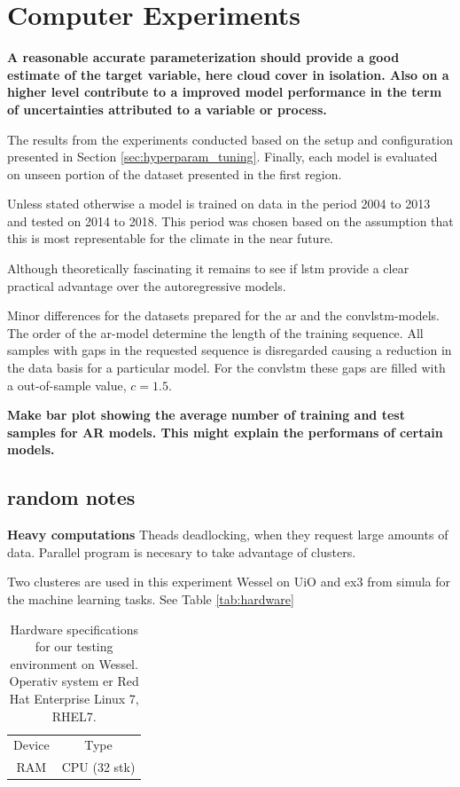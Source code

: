 \chapter{Computer Experiments} \label{ch:computer_experiments}

\textbf{A reasonable accurate parameterization should provide a good estimate of the target variable, here cloud cover in isolation. 
Also on a higher level contribute to a improved model performance in the term of uncertainties attributed to a variable or process.}

The results from the experiments conducted based on the setup and configuration presented in Section \ref{sec:hyperparam_tuning}. Finally, each model is evaluated on unseen portion of the dataset presented in the first region.

Unless stated otherwise a model is trained on data in the period 2004 to 2013 and tested on 2014 to 2018. This period was chosen based on the assumption that this is most representable for the climate in the near future.

Although theoretically fascinating it remains to see if \acrshort{lstm} provide a clear practical advantage over the autoregressive models.

Minor differences for the datasets prepared for the \acrshort{ar} and the \acrshort{convlstm}-models. The order of the \acrshort{ar}-model determine the length of the training sequence. All samples with gaps in the requested sequence is disregarded causing a reduction in the data basis for a particular model. For the \acrshort{convlstm} these gaps are filled with a out-of-sample value, $c=1.5$.

\textbf{Make bar plot showing the average number of training and test samples for AR models. This might explain the performans of certain models. }

\section{random notes}
\textbf{Heavy computations} Theads deadlocking, when they request large amounts of data. Parallel program is necesary to take advantage of clusters. 

Two clusteres are used in this experiment Wessel on UiO and ex3 from simula for the machine learning tasks. See Table \ref{tab:hardware}

\begin{table}[ht]
    \centering
    \begin{tabular}{c|c}
        Device &  Type  \\
        RAM  & 
        CPU (32 stk)  &
    \end{tabular}
    \caption{Hardware specifications for our testing environment on Wessel. Operativ system er Red Hat Enterprise Linux 7, RHEL7.}
    \label{tab:hardware_wessel}
\end{table}

